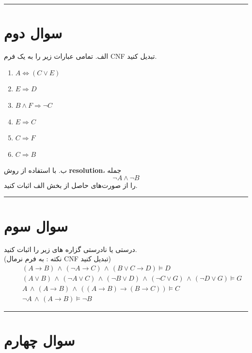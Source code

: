 \documentclass[a4paper,10pt]{article}
\begin{document}
\rule{\linewidth}{0.4pt}

\section{سوال دوم}
الف.
تمامی عبارات زیر را به یک فرم CNF تبدیل کنید.
\begin{latin} 
\begin{enumerate}
    \item $A \Leftrightarrow (C \vee E)$
    \item $E \Rightarrow D$
    \item $B \wedge F \Rightarrow \neg C$
    \item $E \Rightarrow C$
    \item $C \Rightarrow F$
    \item $C \Rightarrow B$
\end{enumerate}
\end{latin}
ب.
با استفاده از روش \textbf{resolution}، جمله
\[
\neg A \wedge \neg B
\]
را از صورت‌های حاصل از بخش الف اثبات کنید.
 
\bigskip
\bigskip
\rule{\linewidth}{0.4pt}

\section{سوال سوم}

درستی یا نادرستی گزاره های زیر را اثبات کنید.\\
(نکته : به فرم نرمال CNF تبدیل کنید)
\begin{align*}
\quad &(A \rightarrow B) \,\land\, (\neg A \rightarrow C) \,\land\, (B \lor C \rightarrow D) \models D \\[6pt]
\quad &(A \lor B) \,\land\, (\neg A \lor C) \,\land\, (\neg B \lor D) \,\land\, (\neg C \lor G) \,\land\, (\neg D \lor G) \models G \\[6pt]
\quad &A \,\land\, (A \rightarrow B) \,\land\, ((A \rightarrow B) \rightarrow (B \rightarrow C)) \models C \\[6pt]
\quad &\neg A \,\land\, (A \rightarrow B) \models \neg B
\end{align*}


\bigskip
\bigskip
\rule{\linewidth}{0.4pt}

\section{سوال چهارم}
\end{document}
